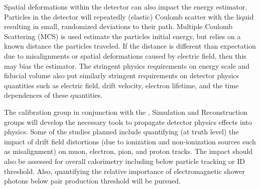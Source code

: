 Spatial deformations within the detector  can also impact the energy estimator. Particles in the detector will repeatedly (elastic) Coulomb scatter with the liquid resulting in small, randomized deviations to their path. Multiple Coulomb Scattering (MCS) is used estimate the particles initial energy, but relies on a known distance the particles traveled. If the  distance is different than expectation due to misalignments or spatial deformations caused by electric field, then this may bias the estimator. The stringent physics requirements on energy scale and fiducial volume also put similarly stringent requirements on detector physics quantities such as electric field, drift velocity, electron lifetime, and the time dependences of these quantities.

The calibration group in conjunction with the , Simulation and Reconstruction groups will develop the necessary tools to propagate detector physics effects into  physics. Some of the studies planned include quantifying (at truth level) the impact of drift field distortions (due to ionization and non-ionization sources such as misalignment) on muon, electron, pion, and proton tracks. The impact should also be assessed for overall calorimetry including below particle tracking or ID threshold. Also,  quantifying the relative importance of electromagnetic shower photons below pair production threshold will be pursued. %




